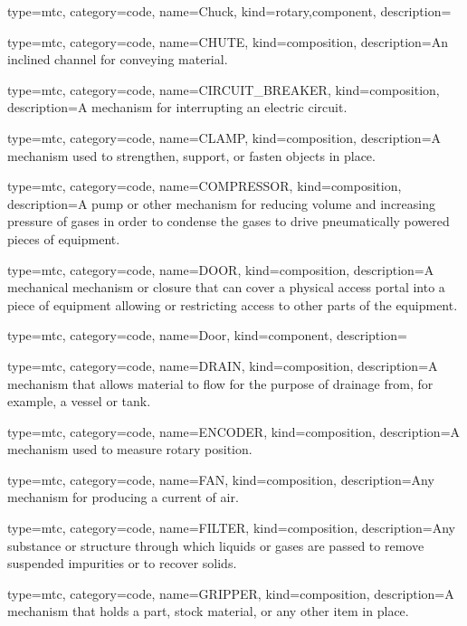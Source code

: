 {
  type=mtc,
  category=code,
  name={Chuck},
  kind={rotary,component},
  description={}
}


{
  type=mtc,
  category=code,
  name={CHUTE},
  kind={composition},
  description={An inclined channel for conveying material.}
}


{
  type=mtc,
  category=code,
  name={CIRCUIT\_BREAKER},
  kind={composition},
  description={A mechanism for interrupting an electric circuit.}
}


{
  type=mtc,
  category=code,
  name={CLAMP},
  kind={composition},
  description={A mechanism used to strengthen, support, or fasten objects in place.}
}


{
  type=mtc,
  category=code,
  name={COMPRESSOR},
  kind={composition},
  description={A pump or other mechanism for reducing volume and increasing pressure of gases in order to condense the gases to drive pneumatically powered pieces of equipment.}
}


{
  type=mtc,
  category=code,
  name={DOOR},
  kind={composition},
  description={A mechanical mechanism or closure that can cover a physical access portal into a piece of equipment allowing or restricting access to other parts of the equipment.}
}


{
  type=mtc,
  category=code,
  name={Door},
  kind={component},
  description={}
}


{
  type=mtc,
  category=code,
  name={DRAIN},
  kind={composition},
  description={A mechanism that allows material to flow for the purpose of drainage from, for example, a vessel or tank.}
}


{
  type=mtc,
  category=code,
  name={ENCODER},
  kind={composition},
  description={A mechanism used to measure rotary position.}
}


{
  type=mtc,
  category=code,
  name={FAN},
  kind={composition},
  description={Any mechanism for producing a current of air.}
}


{
  type=mtc,
  category=code,
  name={FILTER},
  kind={composition},
  description={Any substance or structure through which liquids or gases are passed to remove suspended impurities or to recover solids.}
}


{
  type=mtc,
  category=code,
  name={GRIPPER},
  kind={composition},
  description={A mechanism that holds a part, stock material, or any other item in place.}
}


